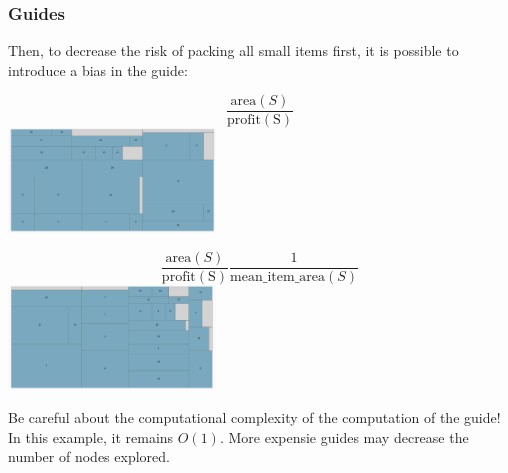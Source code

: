 \documentclass[10pt]{beamer}
\begin{document}
\begin{frame}
  \frametitle{Guides}

  Then, to decrease the risk of packing all small items first, it is possible to introduce a bias in the guide:

  \begin{center}
    \begin{minipage}[t]{0.45\linewidth}
      \begin{center}
        \begin{displaymath}
          \frac{\mathrm{area}(S)}{\mathrm{profit(S)}}
        \end{displaymath}
        \includegraphics[width=5.5cm]{knapsack_guide_4.png}
      \end{center}
    \end{minipage}
    \hspace{0.25cm}
    \begin{minipage}[t]{0.45\linewidth}
      \begin{center}
        \begin{displaymath}
          \frac{\mathrm{area}(S)}{\mathrm{profit(S)}} \frac{1}{\mathrm{mean\_item\_area}(S)}
        \end{displaymath}
        \includegraphics[width=5.5cm]{knapsack_guide_5.png}
      \end{center}
    \end{minipage}
  \end{center}
  \bigskip

  Be careful about the computational complexity of the computation of the guide!
  In this example, it remains $O(1)$. More expensie guides may decrease the number of nodes explored.
\end{frame}
\end{document}
